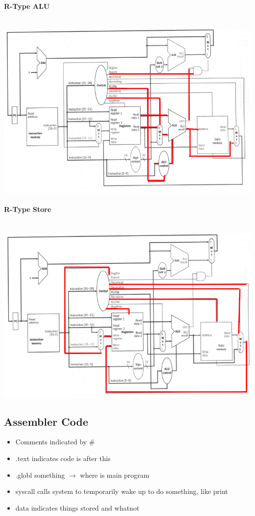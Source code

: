 \documentclass[12 pt]{article}
\begin{document}
	\paragraph{R-Type ALU}~\\ \includegraphics[scale=0.7]{ralu}
	\paragraph{R-Type Store}~\\ \includegraphics[scale=0.7]{rstr}
	\subsection{Assembler Code}
	\begin{itemize}
		\item Comments indicated by \#
		\item .text indicates code is after this
		\item .globl something $\to$ where is main program
		\item syscall calls system to temporarily wake up to do something, like print
		\item data indicates things stored and whatnot
		\end{itemize}
\end{document}
